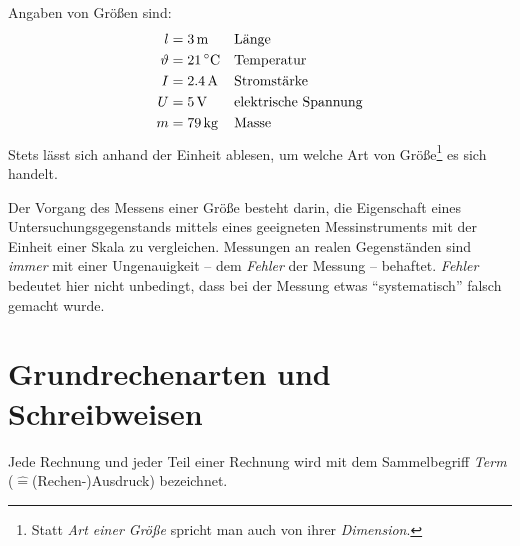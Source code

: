 \begin{bsp}[Größen]
 Angaben von Größen sind:
 \begin{align*}
  l &= 3\,\text{m}&&\text{Länge}\\
  \vartheta &= 21\,\degree\text{C}&&\text{Temperatur}\\
  I &= 2.4\,\text{A}&&\text{Stromstärke}\\
  U&= 5\,\text{V}&&\text{elektrische Spannung}\\
  m &= 79\,\text{kg}&&\text{Masse}
 \end{align*}
 Stets lässt sich anhand der Einheit ablesen, um welche Art von Größe\footnote{Statt \emph{Art einer Größe} spricht man auch von ihrer \emph{Dimension}.} es sich handelt.
\end{bsp}

\begin{beme}[Messen]
 Der Vorgang des Messens einer Größe besteht darin, die Eigenschaft eines Untersuchungsgegenstands mittels eines geeigneten Messinstruments mit der Einheit einer Skala zu vergleichen. Messungen an realen Gegenständen sind \emph{immer} mit einer Ungenauigkeit -- dem \emph{Fehler} der Messung -- behaftet. \emph{Fehler} bedeutet hier nicht unbedingt, dass bei der Messung etwas "`systematisch"' falsch gemacht wurde.
\end{beme}

\section{Grundrechenarten und Schreibweisen}

\begin{defi}[Term]
 Jede Rechnung und jeder Teil einer Rechnung wird mit dem Sammelbegriff \emph{Term} (\(\hat{=}\)(Rechen-)Ausdruck) bezeichnet.
\end{defi}

